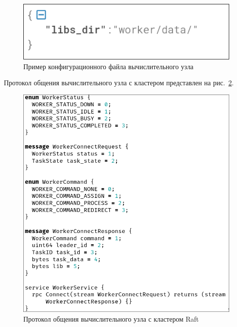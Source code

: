 \begin{figure}
  \centering
  \includegraphics[scale=0.4]{inc/worker-config.png}
  \caption{Пример конфигурационного файла вычислительного узла}
  \label{fig:worker_config}
\end{figure}

Протокол общения вычислительного узла с кластером представлен на
рис.~\ref{fig:worker_proto}.

\begin{figure}
  \centering
  \includegraphics[scale=0.4]{inc/worker-proto.png}
  \caption{Протокол общения вычислительного узла с кластером Raft}
  \label{fig:worker_proto}
\end{figure}

